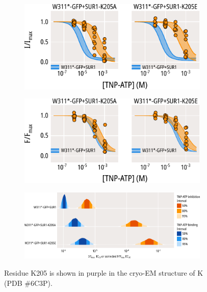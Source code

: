 \begin{figure}[h]
\begin{subfigure}[t]{0.45\textwidth}
	\end{subfigure}
	\vfill
	\begin{subfigure}[t]{0.45\textwidth}
		\caption{}\label{ch6fig:k205_3}
		\centering
		\includegraphics[width=\textwidth]{k205_3.pdf}
	\end{subfigure}
	\hfill
	\begin{subfigure}[t]{0.45\textwidth}
		\caption{}\label{ch6fig:k205_4}
		\centering
		\includegraphics[width=\textwidth]{k205_4.pdf}
	\end{subfigure}
	\vfill
	\begin{subfigure}[t]{0.9\textwidth}
		\caption{}\label{ch6fig:k205_5}
		\centering
		\includegraphics[width=\textwidth]{k205_5.pdf}
	\end{subfigure}
	\caption[Functional effects of mutations at K205]{
	 Residue K205 is shown in purple in the cryo-EM structure of K\ATP{} (PDB \#6C3P).
}
\end{figure}
